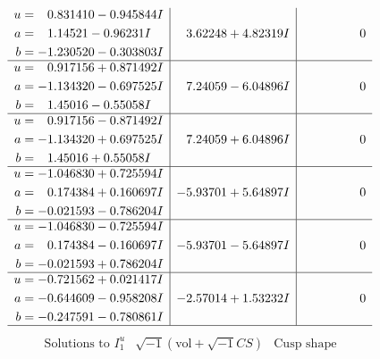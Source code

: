 \documentclass[1p]{elsarticle_modified}
\theoremstyle{definition}
\newcommand{\I}{\sqrt{-1}}
\begin{document}
$$\begin{array}{c|c|c}
\begin{aligned}
u &= \phantom{-}0.831410 - 0.945844 I \\
a &= \phantom{-}1.14521 - 0.96231 I \\
b &= -1.230520 - 0.303803 I\end{aligned}
 & \phantom{-}3.62248 + 4.82319 I & \phantom{-0.000000 } 0 \\ \hline\begin{aligned}
u &= \phantom{-}0.917156 + 0.871492 I \\
a &= -1.134320 - 0.697525 I \\
b &= \phantom{-}1.45016 - 0.55058 I\end{aligned}
 & \phantom{-}7.24059 - 6.04896 I & \phantom{-0.000000 } 0 \\ \hline\begin{aligned}
u &= \phantom{-}0.917156 - 0.871492 I \\
a &= -1.134320 + 0.697525 I \\
b &= \phantom{-}1.45016 + 0.55058 I\end{aligned}
 & \phantom{-}7.24059 + 6.04896 I & \phantom{-0.000000 } 0 \\ \hline\begin{aligned}
u &= -1.046830 + 0.725594 I \\
a &= \phantom{-}0.174384 + 0.160697 I \\
b &= -0.021593 - 0.786204 I\end{aligned}
 & -5.93701 + 5.64897 I & \phantom{-0.000000 } 0 \\ \hline\begin{aligned}
u &= -1.046830 - 0.725594 I \\
a &= \phantom{-}0.174384 - 0.160697 I \\
b &= -0.021593 + 0.786204 I\end{aligned}
 & -5.93701 - 5.64897 I & \phantom{-0.000000 } 0 \\ \hline\begin{aligned}
u &= -0.721562 + 0.021417 I \\
a &= -0.644609 - 0.958208 I \\
b &= -0.247591 - 0.780861 I\end{aligned}
 & -2.57014 + 1.53232 I & \phantom{-0.000000 } 0\\
 \hline 
 \end{array}$$\newpage$$\begin{array}{c|c|c}  
\text{Solutions to }I^u_{1}& \I (\text{vol} + \sqrt{-1}CS) & \text{Cusp shape}\\
 \hline 
\begin{aligned}

\end{aligned}
\end{array}$$
\end{document}
